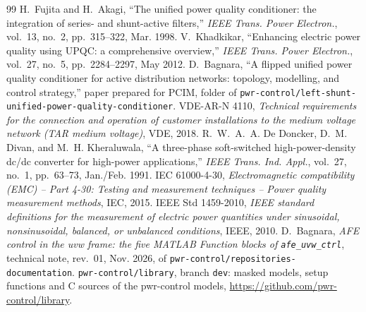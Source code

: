 \documentclass[11pt,a4paper]{scrartcl}
\newcommand{\code}[1]{\texttt{#1}}
\begin{document}
\begin{onehalfspace}
\begin{thebibliography}{99}
	\small
	 H.~Fujita and H.~Akagi, ``The unified power quality conditioner: the integration of series- and shunt-active filters,'' \emph{IEEE Trans. Power Electron.}, vol.~13, no.~2, pp.~315--322, Mar. 1998.
	 V.~Khadkikar, ``Enhancing electric power quality using UPQC: a comprehensive overview,'' \emph{IEEE Trans. Power Electron.}, vol.~27, no.~5, pp.~2284--2297, May 2012.
	 D.~Bagnara, ``A flipped unified power quality conditioner for active distribution networks: topology, modelling, and control strategy,'' paper prepared for PCIM, folder  of \code{pwr-control/left-shunt-unified-power-quality-conditioner}.
	 VDE-AR-N 4110, \emph{Technical requirements for the connection and operation of customer installations to the medium voltage network (TAR medium voltage)}, VDE, 2018.
	 R.~W.~A.~A. De Doncker, D.~M. Divan, and M.~H. Kheraluwala, ``A three-phase soft-switched high-power-density dc/dc converter for high-power applications,'' \emph{IEEE Trans. Ind. Appl.}, vol.~27, no.~1, pp.~63--73, Jan./Feb. 1991.
	 IEC 61000-4-30, \emph{Electromagnetic compatibility (EMC) -- Part 4-30: Testing and measurement techniques -- Power quality measurement methods}, IEC, 2015.
	 IEEE Std 1459-2010, \emph{IEEE standard definitions for the measurement of electric power quantities under sinusoidal, nonsinusoidal, balanced, or unbalanced conditions}, IEEE, 2010.
	 D.~Bagnara, \emph{AFE control in the uvw frame: the five MATLAB Function blocks of \code{afe\_uvw\_ctrl}}, technical note, rev.~01, Nov. 2026,  of \code{pwr-control/repositories-documentation}.
	 \code{pwr-control/library}, branch \code{dev}: masked models, setup functions and C sources of the pwr-control models, \url{https://github.com/pwr-control/library}.
\end{thebibliography}

\end{onehalfspace}
\end{document}
